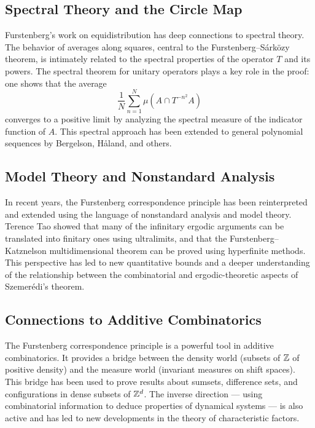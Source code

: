 \subsection{Spectral Theory and the Circle Map}

Furstenberg's work on equidistribution has deep connections to spectral theory. The behavior of averages along squares, central to the Furstenberg--S\'ark\"ozy theorem, is intimately related to the spectral properties of the operator \(T\) and its powers. The spectral theorem for unitary operators plays a key role in the proof: one shows that the average
\[
\frac{1}{N} \sum_{n=1}^{N} \mu(A \cap T^{-n^2}A)
\]
converges to a positive limit by analyzing the spectral measure of the indicator function of \(A\). This spectral approach has been extended to general polynomial sequences by Bergelson, H\aa land, and others.

\subsection{Model Theory and Nonstandard Analysis}

In recent years, the Furstenberg correspondence principle has been reinterpreted and extended using the language of nonstandard analysis and model theory. Terence Tao showed that many of the infinitary ergodic arguments can be translated into finitary ones using ultralimits, and that the Furstenberg--Katznelson multidimensional theorem can be proved using hyperfinite methods. This perspective has led to new quantitative bounds and a deeper understanding of the relationship between the combinatorial and ergodic-theoretic aspects of Szemer\'edi's theorem.

\subsection{Connections to Additive Combinatorics}

The Furstenberg correspondence principle is a powerful tool in additive combinatorics. It provides a bridge between the density world (subsets of \(\mathbb{Z}\) of positive density) and the measure world (invariant measures on shift spaces). This bridge has been used to prove results about sumsets, difference sets, and configurations in dense subsets of \(\mathbb{Z}^d\). The inverse direction --- using combinatorial information to deduce properties of dynamical systems --- is also active and has led to new developments in the theory of characteristic factors.

